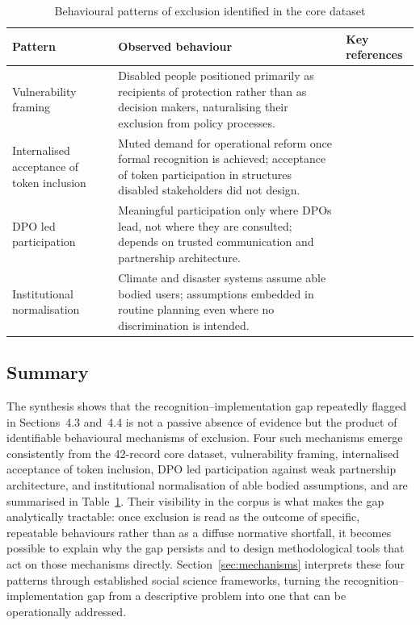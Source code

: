 \documentclass[12pt,a4paper]{report}
\begin{document}
\begin{table}[H]
\centering
\small
\renewcommand{\arraystretch}{1.3}
\caption{Behavioural patterns of exclusion identified in the core dataset}
\label{tab:behavioural-patterns}
\begin{tabularx}{\textwidth}{>{\raggedright\arraybackslash}p{} >{\raggedright\arraybackslash}X >{\raggedright\arraybackslash}p{}}
\toprule
\textbf{Pattern} & \textbf{Observed behaviour} & \textbf{Key references} \\
\midrule
Vulnerability framing
& Disabled people positioned primarily as recipients of protection rather than as decision makers, naturalising their exclusion from policy processes.
& \cite{sheknoble2023communicating,pertiwi2020indonesia,tagalo2020davao,stjernholm2025critical} \\
\midrule
Internalised acceptance of token inclusion
& Muted demand for operational reform once formal recognition is achieved; acceptance of token participation in structures disabled stakeholders did not design.
& \cite{setijaningrum2024tokenism,tagalo2020davao,bennettgayle2020sendai} \\
\midrule
DPO led participation
& Meaningful participation only where DPOs lead, not where they are consulted; depends on trusted communication and partnership architecture.
& \cite{pertiwi2019dpo,villeneuve2017dpo,ton2021agency,craig2023twintrack,rahatiningtyas2025yogyakarta} \\
\midrule
Institutional normalisation
& Climate and disaster systems assume able bodied users; assumptions embedded in routine planning even where no discrimination is intended.
& \cite{lunga2019zimbabwe,brown2025massachusetts,gershon2021fema,ivey2014deafhh,engelman2025california} \\
\bottomrule
\end{tabularx}
\end{table}

\subsection{Summary}
The synthesis shows that the recognition--implementation gap repeatedly flagged in Sections~4.3 and~4.4 is not a passive absence of evidence but the product of identifiable behavioural mechanisms of exclusion. Four such mechanisms emerge consistently from the 42-record core dataset, vulnerability framing, internalised acceptance of token inclusion, DPO led participation against weak partnership architecture, and institutional normalisation of able bodied assumptions, and are summarised in Table~\ref{tab:behavioural-patterns}. Their visibility in the corpus is what makes the gap analytically tractable: once exclusion is read as the outcome of specific, repeatable behaviours rather than as a diffuse normative shortfall, it becomes possible to explain why the gap persists and to design methodological tools that act on those mechanisms directly. Section~\ref{sec:mechanisms} interprets these four patterns through established social science frameworks, turning the recognition--implementation gap from a descriptive problem into one that can be operationally addressed.
\end{document}
